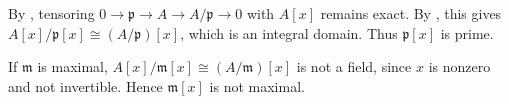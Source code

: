 By , tensoring $0\to\mathfrak{p}\to A\to A/\mathfrak{p}\to0$ with $A[x]$ remains exact. By , this gives $A[x]/\mathfrak{p}[x]\cong(A/\mathfrak{p})[x]$, which is an integral domain. Thus $\mathfrak{p}[x]$ is prime.

If $\mathfrak{m}$ is maximal, $A[x]/\mathfrak{m}[x]\cong(A/\mathfrak{m})[x]$ is not a field, since $x$ is nonzero and not invertible. Hence $\mathfrak{m}[x]$ is not maximal.
